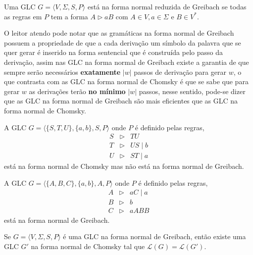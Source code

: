 
\begin{definition}
    Uma GLC $G = \langle V, \Sigma, S, P \rangle$ está na forma normal reduzida de Greibach se todas as regras em $P$ tem a forma $A \rhd aB$ com $A \in V, a \in \Sigma$ e $B \in V^*$.
\end{definition}

O leitor atendo pode notar que as gramáticas na forma normal de Greibach possuem a propriedade de que a cada derivação um símbolo da palavra que se quer gerar é inserido na forma sentencial que é construída pelo passo da derivação, assim nas GLC na forma normal de Greibach existe a garantia de que sempre serão necessários \textbf{exatamente} $|w|$ passos de derivação para gerar $w$, o que contrasta com as GLC na forma normal de Chomsky é que se sabe que para gerar $w$ as derivações terão \textbf{no mínimo} $|w|$ passos, nesse sentido, pode-se dizer que as GLC na forma normal de Greibach são mais eficientes que as GLC na forma normal de Chomsky.

\begin{example}\label{exe:GLC-Para_Converter}
    A GLC $G = \langle \{S, T, U\}, \{a, b\}, S, P \rangle$ onde $P$ é definido pelas regras,
    \begin{eqnarray*}
        S & \rhd & TU\\
        T & \rhd & US \mid b\\
        U & \rhd & ST \mid a
    \end{eqnarray*}
    está na forma normal de Chomsky mas não está na forma normal de Greibach.
\end{example}

\begin{example}\label{exe:FazerNoExercicioGLC}
    A GLC $G = \langle \{A, B, C\}, \{a, b\}, A, P \rangle$ onde $P$ é definido pelas regras,
    \begin{eqnarray*}
        A & \rhd & aC \mid a\\
        B & \rhd & b\\
        C & \rhd & aABB
    \end{eqnarray*}
    está na forma normal de Greibach.
\end{example}

\begin{theorem}
    Se $G = \langle V, \Sigma, S, P \rangle$ é uma GLC na forma normal de Greibach, então existe uma GLC $G'$ na forma normal de Chomsky tal que $\mathcal{L}(G) = \mathcal{L}(G')$.
\end{theorem}

